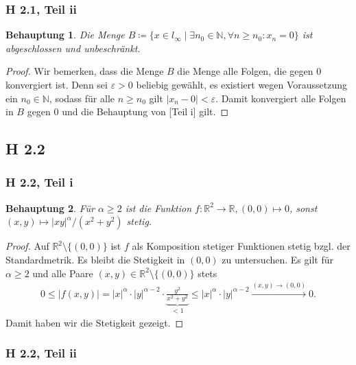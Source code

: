 \documentclass[draft,a5paper]{article}
\newtheorem*{beh}{Behauptung}
\begin{document}
\subsubsection*{H 2.1, Teil ii}

\begin{beh}
  Die Menge \(B \coloneq \{x \in l_{\infty} \mid \exists n_{0} \in \mathbb{N}, \forall n \ge n_{0} \colon x_{n} =
  0\}\) ist abgeschlossen und unbeschränkt.
\end{beh}

\begin{proof}
  Wir bemerken, dass die Menge \(B\) die Menge alle Folgen, die gegen
  \(0\) konvergiert ist.  Denn sei \(\varepsilon > 0\) beliebig gewählt, es
  existiert wegen Voraussetzung ein \(n_{0} \in \mathbb{N}\), sodass für alle \(n
  \ge n_{0}\) gilt \(|x_{n} - 0| < \varepsilon\).  Damit konvergiert alle Folgen in
  \(B\) gegen \(0\) und die Behauptung von [Teil i] gilt.
\end{proof}

\newpage
\subsection*{H 2.2}

\subsubsection*{H 2.2, Teil i}

\begin{beh}
  Für \(\alpha \ge 2\) ist die Funktion \(f\colon \mathbb{R}^{2} \to \mathbb{R}, (0, 0) \mapsto 0\), sonst \((x, y) \mapsto
  |xy|^{\alpha}/(x^{2}+y^{2})\)  stetig.
\end{beh}

\begin{proof}
  Auf \(\mathbb{R}^{2} \setminus \{(0, 0)\}\) ist \(f\) als Komposition stetiger
  Funktionen stetig bzgl. der Standardmetrik.  Es bleibt die
  Stetigkeit in \((0, 0)\) zu untersuchen.  Es gilt für \(\alpha \ge 2\) und
  alle Paare \((x, y) \in \mathbb{R}^{2} \setminus \{(0, 0)\}\) stets
  \begin{align*}
    0 \le |f(x, y)| = |x|^{\alpha} \cdot |y|^{\alpha-2} \cdot \underbrace{\frac{y^{2}}{x^{2} +
    y^{2}}}_{< 1} \le |x|^{\alpha} \cdot |y|^{\alpha-2} \stackrel{(x, y) \to (0, 0)}{\to} 0.
  \end{align*}
  Damit haben wir die Stetigkeit gezeigt.
\end{proof}

\subsubsection*{H 2.2, Teil ii}
\end{document}
